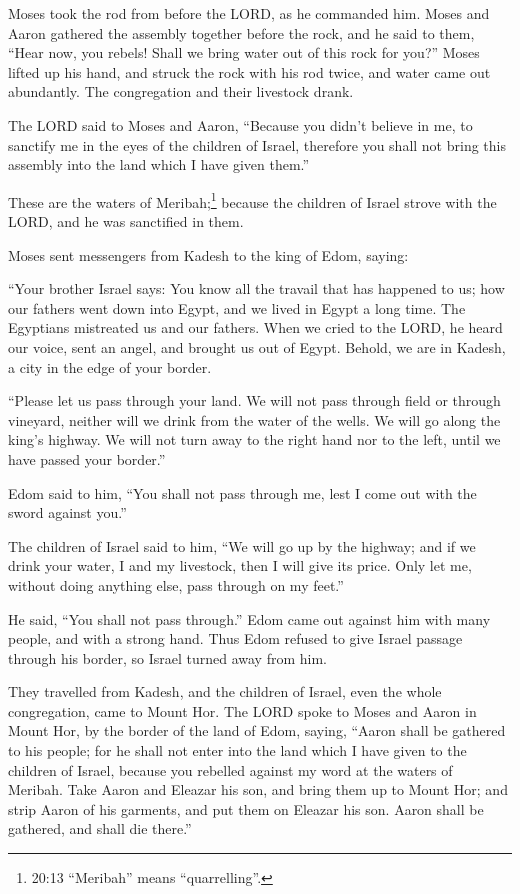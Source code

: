  Moses took the rod from before the LORD, as he commanded
him.  Moses and Aaron gathered the assembly together before
the rock, and he said to them, ``Hear now, you rebels! Shall we bring
water out of this rock for you?''  Moses lifted up his
hand, and struck the rock with his rod twice, and water came out
abundantly. The congregation and their livestock drank.

 The LORD said to Moses and Aaron, ``Because you didn't
believe in me, to sanctify me in the eyes of the children of Israel,
therefore you shall not bring this assembly into the land which I have
given them.''

 These are the waters of Meribah;\footnote{20:13
  ``Meribah'' means ``quarrelling''.} because the children of Israel
strove with the LORD, and he was sanctified in them.

 Moses sent messengers from Kadesh to the king of Edom,
saying:

``Your brother Israel says: You know all the travail that has happened
to us;  how our fathers went down into Egypt, and we lived
in Egypt a long time. The Egyptians mistreated us and our fathers.
 When we cried to the LORD, he heard our voice, sent an
angel, and brought us out of Egypt. Behold, we are in Kadesh, a city in
the edge of your border.

 ``Please let us pass through your land. We will not pass
through field or through vineyard, neither will we drink from the water
of the wells. We will go along the king's highway. We will not turn away
to the right hand nor to the left, until we have passed your border.''

 Edom said to him, ``You shall not pass through me, lest I
come out with the sword against you.''

 The children of Israel said to him, ``We will go up by the
highway; and if we drink your water, I and my livestock, then I will
give its price. Only let me, without doing anything else, pass through
on my feet.''

 He said, ``You shall not pass through.'' Edom came out
against him with many people, and with a strong hand.  Thus
Edom refused to give Israel passage through his border, so Israel turned
away from him.

 They travelled from Kadesh, and the children of Israel,
even the whole congregation, came to Mount Hor.  The LORD
spoke to Moses and Aaron in Mount Hor, by the border of the land of
Edom, saying,  ``Aaron shall be gathered to his people; for
he shall not enter into the land which I have given to the children of
Israel, because you rebelled against my word at the waters of Meribah.
 Take Aaron and Eleazar his son, and bring them up to Mount
Hor;  and strip Aaron of his garments, and put them on
Eleazar his son. Aaron shall be gathered, and shall die there.''

